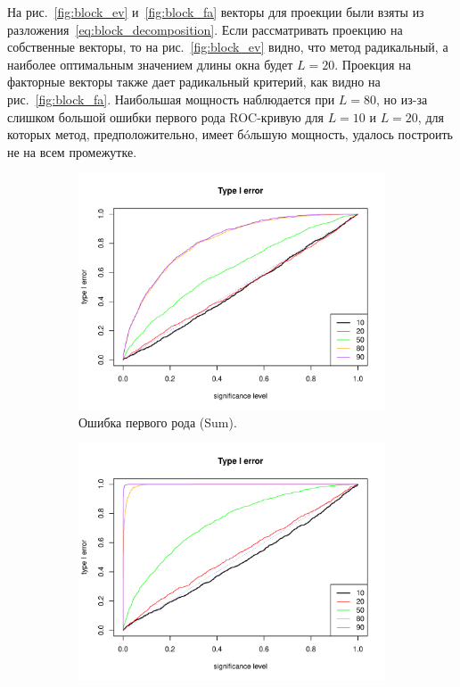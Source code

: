 \documentclass[specialist,
substylefile = spbu_report.rtx,
subf,href,colorlinks=true, 12pt]{disser}
\theoremstyle{definition}
\begin{document}
	На рис.~\ref{fig:block_ev} и~\ref{fig:block_fa} векторы для проекции были взяты из разложения~\eqref{eq:block_decomposition}. Если рассматривать проекцию на собственные векторы, то на рис.~\ref{fig:block_ev} видно, что метод радикальный, а наиболее оптимальным значением длины окна будет $L=20$. Проекция на факторные векторы также дает радикальный критерий, как видно на рис.~\ref{fig:block_fa}. Наибольшая мощность наблюдается при $L=80$, но из-за слишком большой ошибки первого рода ROC-кривую для $L=10$ и $L=20$, для которых метод, предположительно, имеет б\'oльшую мощность, удалось построить не на всем промежутке.
	\begin{figure}
		\captionsetup[subfigure]{justification=Centering}
		\begin{subfigure}[t]{0.45\textwidth}
			\centering
			\includegraphics[width=\textwidth]{type1error_sum_ev.pdf}
			\caption{Ошибка первого рода (Sum).}
		\end{subfigure}\hspace{\fill}
		\begin{subfigure}[t]{0.45\textwidth}
			\centering
			\includegraphics[width=\textwidth]{type1error_mssa_ev.pdf}

\end{subfigure}
\end{figure}
\end{document}
